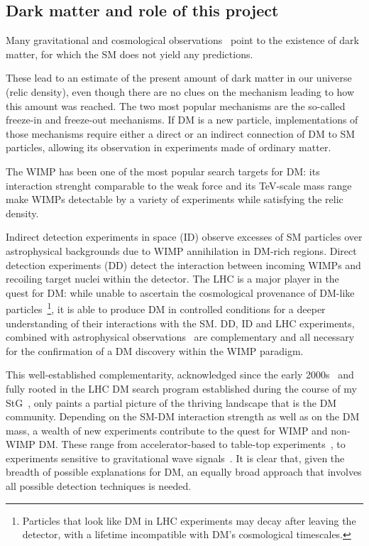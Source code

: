 \subsection{Dark matter and role of this project}
\smallskip

Many gravitational and cosmological observations~\cite{Bertone} point to the existence of dark matter, for which the SM does not yield any predictions. 

These lead to an estimate of the present amount of dark matter in our universe (relic density), even though there are no clues on the mechanism leading to how this amount was reached. The two most popular mechanisms are the so-called freeze-in and freeze-out mechanisms.
If DM is a new particle, implementations of those mechanisms require either a direct or an indirect connection of DM to SM particles, allowing its observation in experiments made of ordinary matter. 

The WIMP has been one of the most popular search targets for DM: its interaction strenght comparable to the weak force and its TeV-scale mass range make WIMPs detectable by a variety of experiments while satisfying the relic density. 

Indirect detection experiments in space (ID) observe excesses of SM particles over astrophysical backgrounds due to WIMP annihilation in DM-rich regions. 
Direct detection experiments (DD) detect the interaction between incoming WIMPs and recoiling target nuclei within the detector. 
The LHC is a major player in the quest for DM: while unable to ascertain the cosmological provenance of DM-like particles~\footnote{Particles that look like DM in LHC experiments may decay after leaving the detector, with a lifetime incompatible with DM’s cosmological timescales.}, it is able to produce DM in controlled conditions for a deeper understanding of their interactions with the SM. 
DD, ID and LHC experiments, combined with  astrophysical observations~\cite{Annika} are complementary and all necessary for the confirmation of a DM discovery within the WIMP paradigm. 

This well-established complementarity, acknowledged since the early 2000s~\cite{Snowmass} and fully rooted in the LHC DM search program established during the course of my StG~\cite{DMWG},  only paints a partial picture of the thriving landscape that is the DM community. 
Depending on the SM-DM interaction strength as well as on the DM mass, a wealth of new experiments contribute to the quest for WIMP and non-WIMP DM. These range from accelerator-based to table-top experiments~\cite{PBC}, to experiments sensitive to gravitational wave signals~\cite{BertoneGW,Cirelli}.  
It is clear that, given the breadth of possible explanations for DM, an equally broad approach that involves all possible detection techniques is needed.

